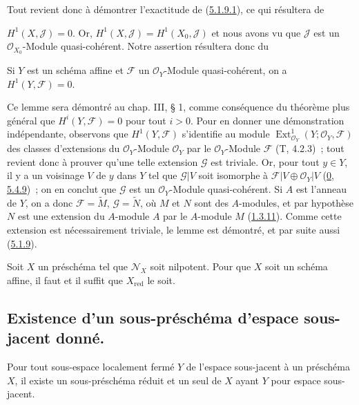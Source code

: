 Tout revient donc à démontrer l'exactitude de
(\hyperref[I.5.1.9.1-fr]{5.1.9.1}), ce qui résultera de

$H^1(X,\mathscr{J})=0$. Or,
$H^1(X,\mathscr{J})=H^1(X_0,\mathscr{J})$ et nous avons vu que
$\mathscr{J}$ est un $\mathscr{O}_{X_0}$-Module quasi-cohérent. Notre
assertion résultera donc du

\begin{lemma}[5.1.9.2]
\label{I.5.1.9.2-fr}
Si $Y$ est un schéma affine et $\mathscr{F}$ un $\mathscr{O}_Y$-Module
quasi-cohérent, on a $H^1(Y,\mathscr{F})=0$.
\end{lemma}

Ce lemme sera démontré au chap. III, § 1, comme conséquence du théorème plus
général que $H^i(Y,\mathscr{F})=0$ pour tout $i>0$. Pour en donner une
démonstration indépendante, observons que $H^1(Y,\mathscr{F})$ s'identifie au
module $\operatorname{Ext}^1_{\mathscr{O}_Y}
(Y;\mathscr{O}_Y,\mathscr{F})$ des classes d'extensions du
$\mathscr{O}_Y$-Module $\mathscr{O}_Y$ par le $\mathscr{O}_Y$-Module
$\mathscr{F}$ (T, 4.2.3)~; tout revient donc à prouver qu'une telle extension
$\mathscr{G}$ est triviale. Or, pour tout $y\in Y$, il y a un voisinage $V$
de $y$ dans $Y$ tel que $\mathscr{G}|V$ soit isomorphe à
$\mathscr{F}|V\oplus\mathscr{O}_Y|V$
(\hyperref[0.5.4.9-fr]{0, 5.4.9})~; on en conclut que $\mathscr{G}$ est un
$\mathscr{O}_Y$-Module quasi-cohérent. Si $A$ est l'anneau de $Y$, on a donc
$\mathscr{F}=\widetilde{M}$, $\mathscr{G}=\widetilde{N}$, où $M$ et $N$ sont
des $A$-modules, et par hypothèse $N$ est une extension du $A$-module $A$ par
le $A$-module $M$ (\hyperref[I.1.3.11-fr]{1.3.11}). Comme cette extension est
nécessairement triviale, le lemme est démontré, et par suite aussi
(\hyperref[I.5.1.9-fr]{5.1.9}).

\begin{corollary}[5.1.10]
\label{I.5.1.10-fr}
Soit $X$ un préschéma tel que $\mathscr{N}_X$ soit nilpotent. Pour que $X$
soit un schéma affine, il faut et il suffit que $X_{\mathrm{red}}$ le soit.
\end{corollary}

\subsection{Existence d'un sous-préschéma d'espace sous-jacent donné.}
\label{subsection:I.5.2-fr}

\begin{proposition}[5.2.1]
\label{I.5.2.1-fr}
Pour tout sous-espace localement fermé $Y$ de l'espace sous-jacent à un
préschéma $X$, il existe un sous-préschéma réduit et un seul de $X$ ayant $Y$
pour espace sous-jacent.
\end{proposition}

